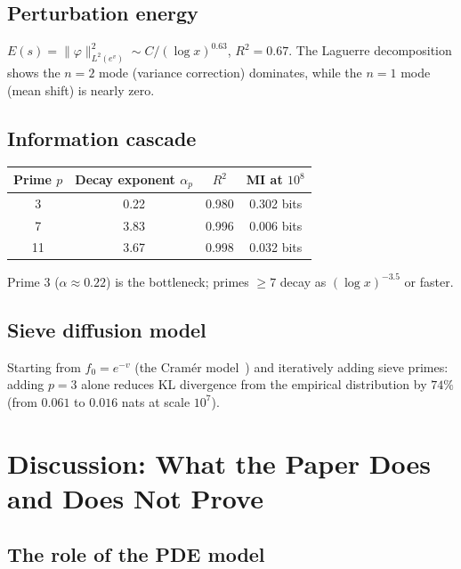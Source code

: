 \documentclass[11pt, a4paper]{amsart}
\theoremstyle{plain}
\theoremstyle{definition}
\begin{document}
\subsection{Perturbation energy}
$E(s) = \|\varphi\|^2_{L^2(e^v)} \sim C/(\log x)^{0.63}$, $R^2 = 0.67$.
The Laguerre decomposition shows the $n=2$ mode (variance correction) dominates, while the $n=1$ 
mode (mean shift) is nearly zero.

\subsection{Information cascade}
\begin{center}
\begin{tabular}{cccc}
\toprule
Prime $p$ & Decay exponent $\alpha_p$ & $R^2$ & MI at $10^8$ \\
\midrule
3 & 0.22 & 0.980 & 0.302 bits \\
7 & 3.83 & 0.996 & 0.006 bits \\
11 & 3.67 & 0.998 & 0.032 bits \\
\bottomrule
\end{tabular}
\end{center}
Prime $3$ ($\alpha \approx 0.22$) is the bottleneck; primes $\ge 7$ decay as $(\log x)^{-3.5}$ or faster.

\subsection{Sieve diffusion model}
Starting from $f_0 = e^{-v}$ (the Cram\'er model~\cite{Cramer1936}) and iteratively adding sieve primes:
adding $p = 3$ alone reduces KL divergence from the empirical distribution by $74\%$ 
(from $0.061$ to $0.016$ nats at scale $10^7$).


\section{Discussion: What the Paper Does and Does Not Prove}
\label{sec:discussion}

\subsection{The role of the PDE model}
\end{document}
